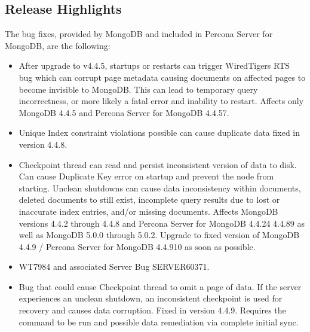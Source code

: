 \documentclass[letterpaper,10pt,english]{sphinxmanual}
\begin{document}
\subsection{Release Highlights}
\label{\detokenize{release_notes/4.4.9-10:release-highlights}}
\sphinxAtStartPar
The bug fixes, provided by MongoDB and included in Percona Server for MongoDB, are the following:
\begin{itemize}
\item {} 
\sphinxAtStartPar
{} \sphinxhyphen{} After upgrade to v4.4.5, startups or restarts can trigger WiredTigers RTS bug which can corrupt page metadata causing documents on affected pages to become invisible to MongoDB. This can lead to temporary query incorrectness, or more likely a fatal error and inability to restart. Affects only MongoDB 4.4.5 and Percona Server for MongoDB 4.4.5\sphinxhyphen{}7.

\item {} 
\sphinxAtStartPar
{} \sphinxhyphen{} Unique Index constraint violations possible \sphinxhyphen{} can cause duplicate data \sphinxhyphen{} fixed in version 4.4.8.

\item {} 
\sphinxAtStartPar
{} \sphinxhyphen{} Checkpoint thread can read and persist inconsistent version of data to disk. Can cause Duplicate Key error on startup and prevent the node from starting. Unclean shutdowns can cause data inconsistency within documents, deleted documents to still exist, incomplete query results due to lost or inaccurate index entries, and/or missing documents. Affects MongoDB versions 4.4.2 through 4.4.8 and Percona Server for MongoDB 4.4.2\sphinxhyphen{}4 \sphinxhyphen{} 4.4.8\sphinxhyphen{}9 as well as MongoDB 5.0.0 through 5.0.2. Upgrade to fixed version of MongoDB 4.4.9 / Percona Server for MongoDB 4.4.9\sphinxhyphen{}10 as soon as possible.

\item {} 
\sphinxAtStartPar
WT\sphinxhyphen{}7984 and associated Server Bug SERVER\sphinxhyphen{}60371.

\item {} 
\sphinxAtStartPar
{} \sphinxhyphen{} Bug that could cause Checkpoint thread to omit a page of data. If the server experiences an unclean shutdown, an inconsistent checkpoint is used for recovery and causes data corruption. Fixed in version 4.4.9.
Requires the   command to be run and possible data remediation via complete initial sync.


\end{itemize}
\end{document}
